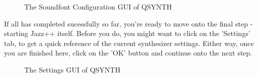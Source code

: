 \documentclass[letterpaper]{report}
\begin{document}
\begin{figure}
\caption{The Soundfont Configuration GUI of QSYNTH}
\end{figure}



If all has completed sucessfully so far, you're ready to move onto
the final step - starting Jazz++ itself. Before you do, you might
want to click on the 'Settings' tab, to get a quick reference of the
current synthesizer settings. Either way, once you are finished here,
click on the 'OK' button and continue onto the next step.



\begin{figure}
\caption{The Settings GUI of QSYNTH}
\end{figure}
\end{document}
